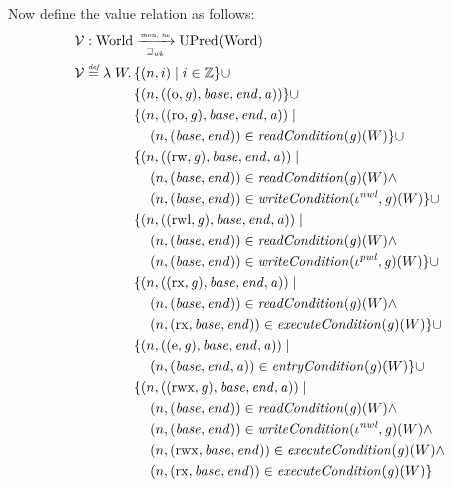 \documentclass[a4paper]{article}
\newcommand{\defeq}{\stackrel{\textit{\tiny{def}}}{=}}
\newcommand{\union}{\mathbin{\cup}}
\newcommand{\var}[1]{\mathit{#1}}
\newcommand{\gl}{\var{g}}
\newcommand{\addr}{\var{a}}
\newcommand{\start}{\var{base}}
\newcommand{\addrend}{\var{end}}
\newcommand{\perm}{\var{perm}}
\newcommand{\stdcap}[1][(\perm,\gl)]{\left(#1,\start,\addrend,\addr \right)}
\newcommand{\plainfun}[2]{
  \ifthenelse{\equal{#2}{}}
             {\mathit{#1}}
             {\mathit{#1}(#2)}
}
\newcommand{\readCond}[1]{\plainfun{readCondition}{#1}}
\newcommand{\writeCond}[1]{\plainfun{writeCondition}{#1}}
\newcommand{\execCond}[1]{\plainfun{executeCondition}{#1}}
\newcommand{\entryCond}[1]{\plainfun{entryCondition}{#1}}
\newcommand{\futurewk}{\mathbin{\sqsupseteq}_{\var{wk}}}
\newcommand{\monwknefun}{\xrightarrow[\text{\tiny{$\futurewk$}}]{\textit{\tiny{mon, ne}}}}
\newcommand{\asmType}{\plaindom{AsmType}}
\newcommand{\plaindom}[1]{\mathrm{#1}}
\newcommand{\Words}{\plaindom{Word}}
\newcommand{\ints}{\mathbb{Z}}
\newcommand{\Worlds}{\plaindom{World}}
\newcommand{\UPred}[1]{\plaindom{UPred}(#1)}
\newcommand{\intr}[2]{\mathcal{#1}}
\newcommand{\valueintr}[1]{\intr{V}{#1}}
\newcommand{\stdvr}{\valueintr{\asmType}}
\newcommand{\npair}[2][n]{\left(#1,#2 \right)}
\newcommand{\plainperm}[1]{\mathrm{#1}}
\newcommand{\noperm}{\plainperm{o}}
\newcommand{\readonly}{\plainperm{ro}}
\newcommand{\readwrite}{\plainperm{rw}}
\newcommand{\exec}{\plainperm{rx}}
\newcommand{\entry}{\plainperm{e}}
\newcommand{\rwx}{\plainperm{rwx}}
\newcommand{\readwritel}{\plainperm{rwl}}
\begin{document}
Now define the value relation as follows:
\begin{align*}
  &\stdvr : \Worlds \monwknefun \UPred{\Words} \\
  &\stdvr\defeq \lambda \; W \ldotp 
           \begin{aligned}[t]
             & \{ \npair{i} \mid i \in \ints \} 
             \union \\
             & \{ \npair{\stdcap[(\noperm,\gl)] }  \} 
             \union \\
             & \{ \npair{\stdcap[(\readonly,\gl)] } \mid \\
             & \quad \npair{(\start,\addrend)} \in \readCond{}(\gl)(W)\} 
             \union \\
             & \{ \npair{\stdcap[(\readwrite,\gl)] } \mid \\
             & \quad \npair{(\start,\addrend)} \in \readCond{}(\gl)(W) \land \\
             & \quad \npair{(\start,\addrend)} \in \writeCond{}(\iota^{\var{nwl}},\gl)(W) \}
             \union \\
             & \{ \npair{\stdcap[(\readwritel,\gl)] } \mid \\
             & \quad \npair{(\start,\addrend)} \in \readCond{}(\gl)(W) \land \\
             & \quad \npair{(\start,\addrend)} \in \writeCond{}(\iota^{\var{pwl}},\gl)(W) \}
             \union \\
             & \{ \npair{\stdcap[(\exec,\gl)]} \mid \\
             & \quad \npair{(\start,\addrend)} \in \readCond{}(\gl)(W) \land \\
             & \quad \npair{(\exec,\start,\addrend)} \in \execCond{}(\gl)(W) \} 
             \union \\
             & \{ \npair{\stdcap[(\entry,\gl)]} \mid \\
             & \quad \npair{(\start,\addrend,\addr)} \in \entryCond{}(\gl)(W)\} 
             \union \\
             & \{ \npair{\stdcap[(\rwx,\gl)]} \mid \\
             & \quad \npair{(\start,\addrend)} \in \readCond{}(\gl)(W) \land \\
             & \quad \npair{(\start,\addrend)} \in \writeCond{}(\iota^{\var{nwl}},\gl)(W) \land\\
             & \quad \npair{(\rwx,\start,\addrend)} \in \execCond{}(\gl)(W)  \land \\
             & \quad \npair{(\exec,\start,\addrend)} \in \execCond{}(\gl)(W) \}

\end{aligned}
\end{align*}
\end{document}
